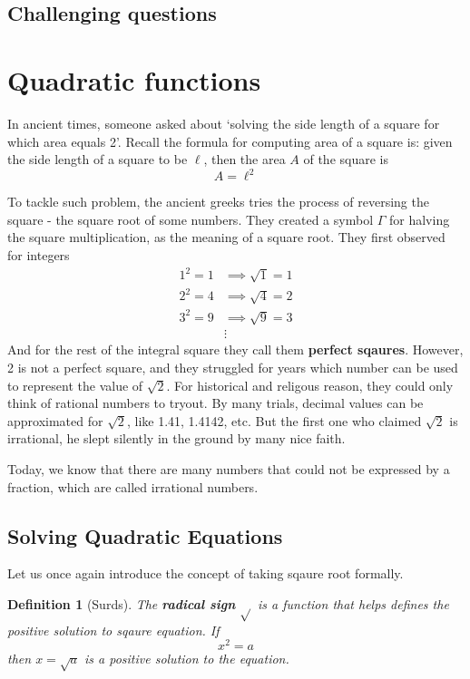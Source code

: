 \documentclass[12pt]{article}
\newtheorem{definition}{Definition}[section]
\begin{document}
    \subsection{Challenging questions}

    \newpage

    \section{Quadratic functions}

    In ancient times, someone asked about `solving the side length of a square for which area equals 2'. Recall the formula for computing area of a square is: given the side length of a square to be $\ell$, then the area $A$ of the square is \[A=\ell^2\]

    To tackle such problem, the ancient greeks tries the process of reversing the square - the square root of some numbers. They created a symbol \(\Gamma\) for halving the square multiplication, as the meaning of a square root. They first observed for integers \begin{align*}
        1^2=1 &\implies \sqrt{1} = 1\\
        2^2=4 &\implies \sqrt{4} = 2\\
        3^2=9 &\implies \sqrt{9} = 3\\
        &\vdots
    \end{align*}
    And for the rest of the integral square they call them \textbf{perfect sqaures}. However, 2 is not a perfect square, and they struggled for years which number can be used to represent the value of \(\sqrt{2}\). For historical and religous reason, they could only think of rational numbers to tryout. By many trials, decimal values can be approximated for \(\sqrt{2}\), like 1.41, 1.4142, etc. But the first one who claimed \(\sqrt{2}\) is irrational, he slept silently in the ground by many nice faith.

    Today, we know that there are many numbers that could not be expressed by a fraction, which are called irrational numbers.

    \subsection{Solving Quadratic Equations}

    Let us once again introduce the concept of taking sqaure root formally.

    \begin{definition}[Surds]
        The \textbf{radical sign} \(\sqrt{}\) is a function that helps defines the positive solution to sqaure equation. If \[x^2=a\] then \(x=\sqrt{a}\) is a positive solution to the equation.
    \end{definition}
\end{document}
